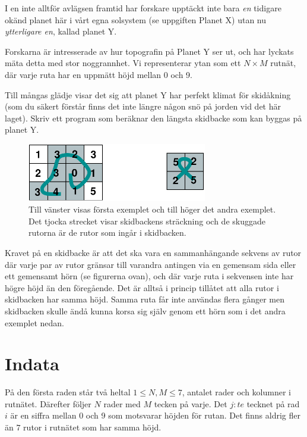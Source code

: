 
I en inte alltför avlägsen framtid har forskare upptäckt inte bara {\em en} tidigare okänd planet här i vårt egna solsystem (se uppgiften Planet X) utan nu {\em ytterligare en}, kallad planet Y.

Forskarna är intresserade av hur topografin på Planet Y ser ut, och har lyckats mäta detta med stor noggrannhet. Vi representerar ytan som ett $N \times M$ rutnät, där varje ruta har en uppmätt höjd mellan 0 och 9.

Till mångas glädje visar det sig att planet Y har perfekt klimat för skidåkning (som du säkert förstår finns det inte längre någon snö på jorden vid det här laget). Skriv ett program som beräknar den längsta skidbacke som kan byggas på planet Y.

\begin{figure}[h]
  \centering
      \includegraphics[width=0.7\textwidth]{planetbackefig2}
      \caption{Till vänster visas första exemplet och till höger det andra exemplet. Det tjocka strecket visar skidbackens sträckning och de skuggade rutorna är de rutor som ingår i skidbacken.}
\end{figure}

Kravet på en skidbacke är att det ska vara en sammanhängande sekvens av rutor där varje par av rutor gränsar till varandra antingen via en gemensam sida eller ett gemensamt hörn (se figurerna ovan), och där varje ruta i sekvensen inte har högre höjd än den föregående. Det är alltså i princip tillåtet att alla rutor i skidbacken har samma höjd. Samma ruta får inte användas flera gånger men skidbacken skulle ändå kunna korsa sig själv genom ett hörn som i det andra exemplet nedan.

\section*{Indata}
På den första raden står två heltal $1 \le N,M \le 7$, 
antalet rader och kolumner i rutnätet.
Därefter följer $N$ rader med $M$ tecken på varje.
Det $j:te$ tecknet på rad $i$ är en siffra mellan
0 och 9 som motsvarar höjden för rutan. Det finns aldrig fler än $7$ rutor i rutnätet som har samma höjd.

